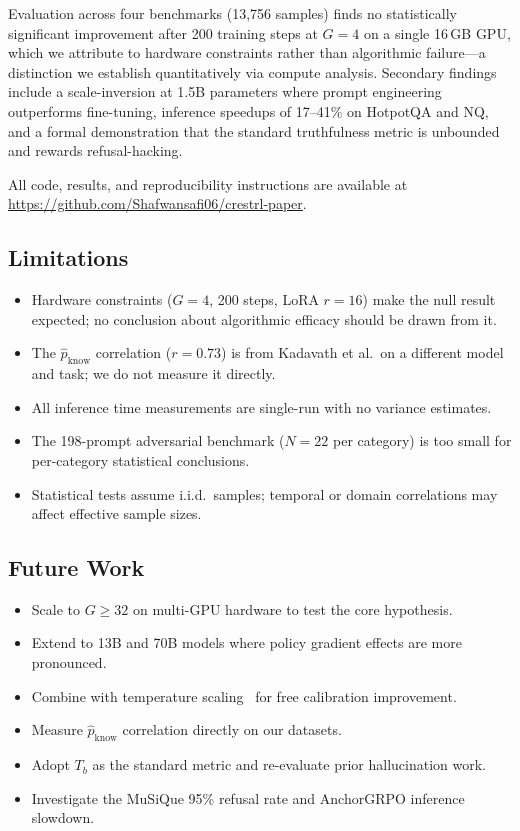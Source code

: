 \documentclass[11pt]{article}
\begin{document}
Evaluation across four benchmarks (13{,}756 samples) finds no statistically significant improvement after 200 training steps at $G=4$ on a single 16\,GB GPU, which we attribute to hardware constraints rather than algorithmic failure---a distinction we establish quantitatively via compute analysis. Secondary findings include a scale-inversion at 1.5B parameters where prompt engineering outperforms fine-tuning, inference speedups of 17--41\% on HotpotQA and NQ, and a formal demonstration that the standard truthfulness metric is unbounded and rewards refusal-hacking.

All code, results, and reproducibility instructions are available at \url{https://github.com/Shafwansafi06/crestrl-paper}.

\subsection{Limitations}

\begin{itemize}
    \item Hardware constraints ($G=4$, 200 steps, LoRA $r=16$) make the null result expected; no conclusion about algorithmic efficacy should be drawn from it.
    \item The $\hat{p}_{\text{know}}$ correlation ($r=0.73$) is from Kadavath et al.\ on a different model and task; we do not measure it directly.
    \item All inference time measurements are single-run with no variance estimates.
    \item The 198-prompt adversarial benchmark ($N=22$ per category) is too small for per-category statistical conclusions.
    \item Statistical tests assume i.i.d.\ samples; temporal or domain correlations may affect effective sample sizes.
\end{itemize}

\subsection{Future Work}

\begin{itemize}
    \item Scale to $G\geq32$ on multi-GPU hardware to test the core hypothesis.
    \item Extend to 13B and 70B models where policy gradient effects are more pronounced.
    \item Combine with temperature scaling~\cite{guo2017calibration} for free calibration improvement.
    \item Measure $\hat{p}_{\text{know}}$ correlation directly on our datasets.
    \item Adopt $T_b$ as the standard metric and re-evaluate prior hallucination work.
    \item Investigate the MuSiQue 95\% refusal rate and AnchorGRPO inference slowdown.
\end{itemize}
\end{document}
